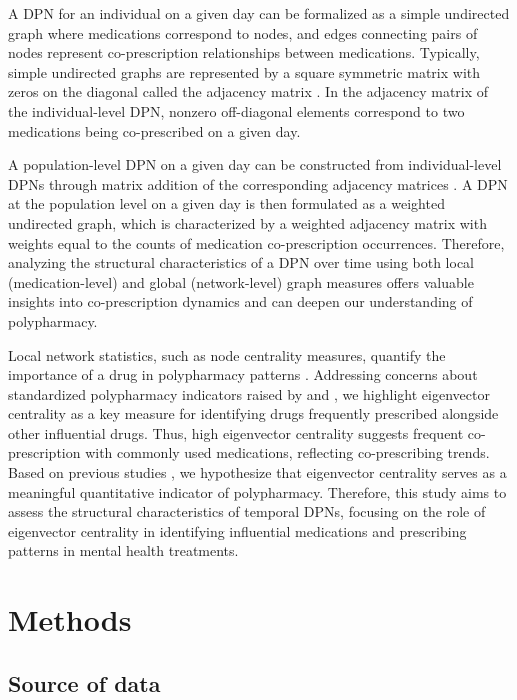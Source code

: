\documentclass[
  authoryear,
  review]{elsarticle}
\begin{document}
A DPN for an individual on a given day can be formalized as a simple undirected graph where medications correspond to nodes, and edges connecting pairs of nodes represent co-prescription relationships between medications. Typically, simple undirected graphs are represented by a square symmetric matrix with zeros on the diagonal called the adjacency matrix \citep{estrada2012structure}. In the adjacency matrix of the individual-level DPN, nonzero off-diagonal elements correspond to two medications being co-prescribed on a given day. 

A population-level DPN on a given day can be constructed from individual-level DPNs through matrix addition of the corresponding adjacency matrices \citep{Cavallo2012}. A DPN at the population level on a given day is then formulated as a weighted undirected graph, which is characterized by a weighted adjacency matrix with weights equal to the counts of medication co-prescription occurrences. Therefore, analyzing the structural characteristics of a DPN over time using both local (medication-level) and global (network-level) graph measures offers valuable insights into co-prescription dynamics and can deepen our understanding of polypharmacy.

Local network statistics, such as node centrality measures, quantify the
importance of a drug in polypharmacy patterns \citep{Askar2021}. Addressing concerns about standardized polypharmacy indicators raised by \citet{Sirois2016} and \citet{Delara2022}, we highlight eigenvector centrality as a key measure for identifying drugs frequently prescribed alongside other influential drugs. Thus, high eigenvector centrality suggests frequent co-prescription with commonly used medications, reflecting co-prescribing trends. Based on previous studies \citep{Cavallo2012, Bazzoni2015}, we hypothesize that eigenvector centrality serves as a meaningful quantitative indicator of polypharmacy. Therefore, this study aims to assess the structural characteristics of temporal DPNs, focusing on the role of eigenvector centrality in identifying influential medications and prescribing patterns in mental health treatments.



\section{Methods}\label{methods}

\subsection{Source of data}\label{source-of-data}
\end{document}
